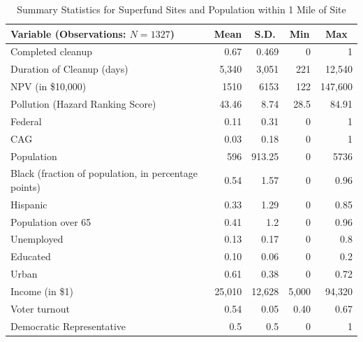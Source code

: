 \documentclass[12pt]{article}
\begin{document}
\begin{table}[t] 
	\centering	 \footnotesize
	\caption{\small Summary Statistics for Superfund Sites and Population within 1 Mile of Site} \label{summstat}
	\tabcolsep 9pt
		\begin{tabular}{lrrrr}
		\hline 
			Variable (Observations: {$N = 1327$}) & \multicolumn{1}{c}{Mean} & \multicolumn{1}{c}{S.D.} & \multicolumn{1}{c}{Min} & \multicolumn{1}{c}{Max} \\ \hline  
			Completed cleanup &  {0.67} &  {0.469} &  {0} &  {1} \\
			Duration of Cleanup (days) &  {5,340} &  {3,051} &  {221} &  {12,540} \\
			NPV (in \$10,000) &  {1510} &  {6153} &  {122} &  {147,600} \\
			Pollution (Hazard Ranking Score) &  {43.46} &  {8.74} &  {28.5} &  {84.91} \\
			{Federal}  &  {0.11} &  {0.31} &  {0} &  {1} \\
			CAG   &  {0.03} &  {0.18} &  {0} &  {1} \\
			Population &  {596} &  {913.25} &  {0} &  {5736} \\
			Black (fraction of population, in percentage points) &  {0.54} &  {1.57} &  {0} &  {0.96} \\
			Hispanic &  {0.33} &  {1.29} &  {0} &  {0.85} \\
			Population over 65 &  {0.41} &  {1.2} &  {0} &  {0.96} \\
			Unemployed &  {0.13} &  {0.17} &  {0} &  {0.8} \\
			Educated  &  {0.10} &  {0.06} &  {0} &  {0.2} \\
			Urban &  {0.61} &  {0.38} &  {0} &  {0.72} \\
			Income (in \$1) &  {25,010} &  {12,628} &  {5,000} &  {94,320} \\
			Voter turnout  &  {0.54} &  {0.05} &  {0.40} &  {0.67} \\
			Democratic Representative &  {0.5} &  {0.5} &  {0} &  {1} \\
			\hline
	\end{tabular}
\end{table}
\end{document}
